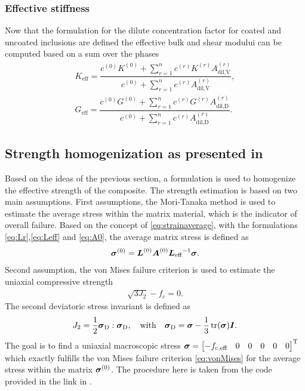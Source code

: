 \subsubsection{Effective stiffness}
Now that the formulation for the dilute concentration factor for coated and uncoated inclusions are defined the effective bulk and shear modului can be computed based on a sum over the phases
\begin{align}
	K_{\text{eff}} = \dfrac{c^{(0)}K^{(0)} + \sum^{n}_{r=1} c^{(r)} K^{(r)} A_{\text{dil,V}}^{(r)}}{c^{(0)} + \sum^{n}_{r=1} c^{(r)} A_{\text{dil,V}}^{(r)}},\label{eq:keff} \\
	G_{\text{eff}} = \dfrac{c^{(0)}G^{(0)} + \sum^{n}_{r=1} c^{(r)} G^{(r)} A_{\text{dil,D}}^{(r)}}{c^{(0)} + \sum^{n}_{r=1} c^{(r)} A_{\text{dil,D}}^{(r)}}.\label{eq:geff}
\end{align}

\subsection{Strength homogenization as presented in \cite{nev_2018_mcam}}
Based on the ideas of the previous section, a formulation is used to homogenize the effective strength of the composite.
The strength estimation is based on two main assumptions.
First assumptions, the Mori-Tanaka method is used to estimate the average stress within the matrix material, which is the indicator of overall failure.
Based on the concept of \eqref{eq:strainaverage}, with the formulations \eqref{eq:Lr},\eqref{eq:Leff} and \eqref{eq:A0}, the average matrix stress is defined as 
\begin{align}
	\boldsymbol{\sigma}^{(0)} = \boldsymbol{L}^{(0)}\boldsymbol{A}^{(0)} {\boldsymbol{L}_{\text{eff}}}^{-1}\boldsymbol{\sigma}. \label{eq:matrixstress}
\end{align}
Second assumption, the von Mises failure criterion is used to estimate the uniaxial compressive strength
\begin{align}
	\sqrt{3 J_2} - {f_c} = 0. \label{eq:vonMises}
\end{align}
The second deviatoric stress invariant is defined as
\begin{align}
	J_2 = \frac{1}{2} \boldsymbol{\sigma}_{\text{D}}:\boldsymbol{\sigma}_{\text{D}},\quad\text{with}\quad
	\boldsymbol{\sigma}_{\text{D}} = \boldsymbol{\sigma} - \frac{1}{3}\operatorname{tr}(\boldsymbol{\sigma})\boldsymbol{I}.
\end{align}
The goal is to find a uniaxial macroscopic stress $\boldsymbol{\sigma} = \begin{bmatrix} -f_{\text{c,eff}} & 0 & 0 &0&0&0 \end{bmatrix}^\text{T}$ which exactly fulfills the von Mises failure criterion \eqref{eq:vonMises} for the average stress within the matrix $\boldsymbol{\sigma}^{(0)}$.
The procedure here is taken from the code provided in the link in \cite{nee_2012_ammf}.

